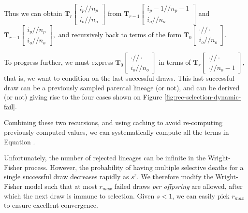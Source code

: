 \documentclass[review]{elsarticle}
\newcommand{\dslash}{/\!\!/}
\newcommand{\Coalc}[4]{\begin{bmatrix}#1\dslash #2 \\ #3\dslash #4 \end{bmatrix}}
\newcommand{\sgcomment}[1]{{\color{red}{SG: #1}}}
\begin{document}
 Thus we can obtain $\mathbf{T}_{r}\Coalc{i_p}{n_p}{i_o}{n_o}$ from   $\mathbf{T}_{r-1}\Coalc{i_p-1}{n_p-1}{i_o}{n_o}$ and 
 $\mathbf{T}_{r-1}\Coalc{i_p}{n_p}{i_o}{n_o},$ and recursively back to terms of the form  $\mathbf{T}_{0}\Coalc{\cdot}{\cdot}{i_o}{n_o}.$
  
  To progress further, we must express $\mathbf{T}_{0}\Coalc{\cdot}{\cdot}{i_o}{n_o}$ in terms of $\mathbf{T}_{r}\Coalc{\cdot}{\cdot}{\cdot}{n_o-1}$,
  that is, we want to condition on the last successful draws. This last successful draw can be a previously sampled parental lineage (or not), and can be derived (or not)
  giving rise to the four cases shown on Figure \ref{fig:rec-selection-dynamic-fail}. 
  
  Combining these two recursions, and using caching to avoid re-computing previously computed values, we can systematically compute all the terms in Equation \sgcomment{blah}.




Unfortunately, the number of rejected lineages can be infinite in the Wright-Fisher process. However, the probability of having multiple selective deaths for a single successful
draw  decreases rapidly as $s^r.$
We therefore modify the Wright-Fisher model such that at most $r_{max}$ failed draws \emph{per offpsring} are allowed, after which the next draw is immune to selection. 
Given $s<1$, we can easily pick $r_{max}$ to ensure excellent convergence.

   

\end{document}
